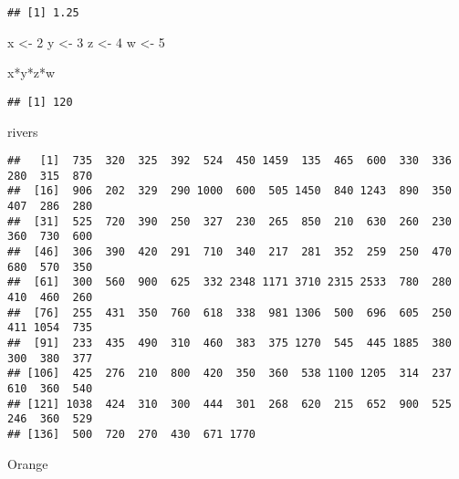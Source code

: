\documentclass[
]{book}
\newenvironment{Shaded}{\begin{snugshade}}{\end{snugshade}}
\newcommand{\DecValTok}[1]{\textcolor[rgb]{0.00,0.00,0.81}{#1}}
\newcommand{\NormalTok}[1]{#1}
\newcommand{\OtherTok}[1]{\textcolor[rgb]{0.56,0.35,0.01}{#1}}
\newcommand{\SpecialCharTok}[1]{\textcolor[rgb]{0.00,0.00,0.00}{#1}}
\theoremstyle{definition}
\theoremstyle{definition}
\theoremstyle{definition}
\theoremstyle{definition}
\theoremstyle{remark}
\begin{document}
\begin{verbatim}
## [1] 1.25
\end{verbatim}

\begin{Shaded}
\begin{Highlighting}[]
\NormalTok{x }\OtherTok{\textless{}{-}} \DecValTok{2}
\NormalTok{y }\OtherTok{\textless{}{-}} \DecValTok{3}
\NormalTok{z }\OtherTok{\textless{}{-}} \DecValTok{4}
\NormalTok{w }\OtherTok{\textless{}{-}} \DecValTok{5}

\NormalTok{x}\SpecialCharTok{*}\NormalTok{y}\SpecialCharTok{*}\NormalTok{z}\SpecialCharTok{*}\NormalTok{w}
\end{Highlighting}
\end{Shaded}

\begin{verbatim}
## [1] 120
\end{verbatim}

\begin{Shaded}
\begin{Highlighting}[]
\NormalTok{rivers}
\end{Highlighting}
\end{Shaded}

\begin{verbatim}
##   [1]  735  320  325  392  524  450 1459  135  465  600  330  336  280  315  870
##  [16]  906  202  329  290 1000  600  505 1450  840 1243  890  350  407  286  280
##  [31]  525  720  390  250  327  230  265  850  210  630  260  230  360  730  600
##  [46]  306  390  420  291  710  340  217  281  352  259  250  470  680  570  350
##  [61]  300  560  900  625  332 2348 1171 3710 2315 2533  780  280  410  460  260
##  [76]  255  431  350  760  618  338  981 1306  500  696  605  250  411 1054  735
##  [91]  233  435  490  310  460  383  375 1270  545  445 1885  380  300  380  377
## [106]  425  276  210  800  420  350  360  538 1100 1205  314  237  610  360  540
## [121] 1038  424  310  300  444  301  268  620  215  652  900  525  246  360  529
## [136]  500  720  270  430  671 1770
\end{verbatim}

\begin{Shaded}
\begin{Highlighting}[]
\NormalTok{Orange}
\end{Highlighting}
\end{Shaded}
\end{document}
